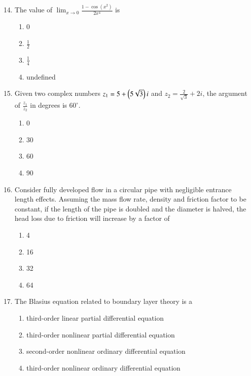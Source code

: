 \documentclass[journal,9pt,onecolumn]{IEEEtran}
\begin{document}
\begin{enumerate}
\setcounter{enumi}{13}
\item The value of $\lim_{{x \to 0}} \frac{1 - \cos(x^2)}{2x^4} $ is
\begin{multicols}{4}
\begin{enumerate}
    \item 0
    \item $\frac{1}{2}$
    \item $\frac{1}{4}$
    \item undefined
\end{enumerate}
\end{multicols}

\item Given two complex numbers $z_1 = 5 + \left(5\sqrt{3}\right)i$ and $z_2 = \frac{2}{\sqrt{3}} + 2i$, the argument of $\frac{z_1}{z_2}$ in degrees is $60^\circ$.

\begin{multicols}{4}
\begin{enumerate}
    \item 0
    \item 30
    \item 60
    \item 90
\end{enumerate}
\end{multicols}


\item Consider fully developed flow in a circular pipe with negligible entrance length effects. Assuming the mass flow rate, density and friction factor to be constant, if the length of the pipe is doubled and the diameter is halved, the head loss due to friction will increase by a factor of
\begin{multicols}{4}
\begin{enumerate}
    \item 4
    \item 16
    \item 32
    \item 64
\end{enumerate}
\end{multicols}

\item The Blasius equation related to boundary layer theory is a

\begin{enumerate}
    \item third-order linear partial differential equation
    \item third-order nonlinear partial differential equation
    \item second-order nonlinear ordinary differential equation
    \item third-order nonlinear ordinary differential equation
\end{enumerate}



\end{enumerate}
\end{document}
